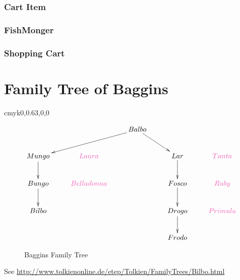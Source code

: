 \subsection {Cart Item}

\cleardoublepage
\subsection {FishMonger}

\cleardoublepage
\subsection {Shopping Cart}























\chapter{Family Tree of Baggins}
\definecolor {CarnationPink} {cmyk}{0,0.63,0,0}
\begin{figure}[!hbp]
\center
	\begin {displaymath}
	\xymatrix {
	&& Balbo\ar[dll] \ar[dr]\\
Mungo \ar [d] &	\textcolor{CarnationPink} {Laura}	&& Lar \ar[d] & \textcolor{CarnationPink} {Tanta}\\
Bungo \ar[d] &  \textcolor{CarnationPink} {Belladonna}	&& Fosco \ar[d]& \textcolor{CarnationPink} {Ruby}\\
Bilbo					&&& Drogo\ar[d] & \textcolor{CarnationPink} {Primula} \\
							&&& Frodo
}	\end {displaymath}
\caption{Baggins Family Tree}
\end{figure}
\par
See \href {http://www.tolkienonline.de/etep/Tolkien/FamilyTrees/Bilbo.html} {http://www.tolkienonline.de/etep/Tolkien/FamilyTrees/Bilbo.html}

